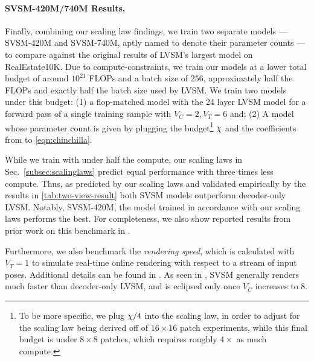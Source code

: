 

\paragraph{SVSM-420M/740M Results.}
%
Finally, combining our scaling law findings, we train two separate models --- SVSM-420M and SVSM-740M, aptly named to denote their parameter counts --- to compare against the original results of LVSM's largest model on RealEstate10K. Due to compute-constraints, we train our models at a lower total budget of around $10^{21}$ FLOPs and a batch size of $256$,  approximately half the FLOPs and exactly half the batch size used by LVSM.  We train two models under this budget: (1) a flop-matched model with the 24 layer LVSM model for a forward pass of a single training sample with $V_C = 2, V_T=  6$ and; (2) A model whose parameter count is given by plugging the budget\footnote{To be more specific, we plug $\chi/4$ into the scaling law, in order to adjust for the scaling law being derived off of $16\times 16$ patch experiments, while this final budget is under $8\times 8$ patches, which requires roughly $4\times$ as much compute.} $\chi$ and the coefficients from  to \eqref{eqn:chinchilla}.

While we train with under half the compute, our scaling laws in Sec.~\ref{subsec:scalinglaws} predict equal performance with three times less compute. Thus, as predicted by our scaling laws and validated empirically by the results in \ref{tab:two-view-result} both SVSM models outperform decoder-only LVSM. Notably, SVSM-420M, the model trained in accordance with our scaling laws performs the best. For completeness, we also show reported results from prior work on this benchmark in . 

Furthermore, we also benchmark the \textit{rendering speed}, which is calculated with $V_T = 1$ to simulate real-time online rendering with respect to a stream of input poses. Additional details can be found in . As seen in , SVSM generally renders much faster than decoder-only LVSM, and  is eclipsed only once $V_C$ increases to $8$. 







